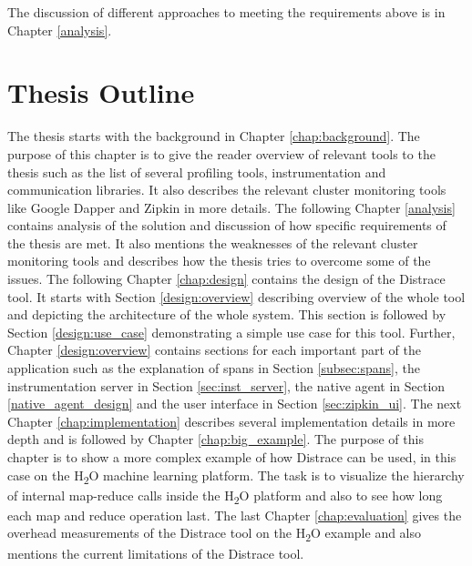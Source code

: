 The discussion of different approaches to meeting the requirements above is in Chapter \ref{analysis}.

\section{Thesis Outline}
The thesis starts with the background in Chapter \ref{chap:background}. The purpose of this chapter is to give the reader overview of relevant tools to the thesis such as the list of several profiling tools, instrumentation and communication libraries. It also describes the relevant cluster monitoring tools like Google Dapper and Zipkin in more details. The following Chapter \ref{analysis} contains analysis of the solution and discussion of how specific requirements of the thesis are met. It also mentions the weaknesses of the relevant cluster monitoring tools and describes how the thesis tries to overcome some of the issues. The following Chapter \ref{chap:design} contains the design of the Distrace tool. It starts with Section \ref{design:overview} describing overview of the whole tool and depicting the architecture of the whole system. This section is followed by Section \ref{design:use_case} demonstrating a simple use case for this tool. Further, Chapter \ref{design:overview} contains sections for each important part of the application such as the explanation of spans in Section \ref{subsec:spans}, the instrumentation server in Section \ref{sec:inst_server}, the native agent in Section \ref{native_agent_design} and the user interface in Section \ref{sec:zipkin_ui}. The next Chapter \ref{chap:implementation} describes several implementation details in more depth and is followed by Chapter \ref{chap:big_example}. The purpose of this chapter is to show a more complex example of how Distrace can be used, in this case on the H\textsubscript{2}O machine learning platform. The task is to visualize the hierarchy of internal map-reduce calls inside the H\textsubscript{2}O platform and also to see how long each map and reduce operation last. The last Chapter \ref{chap:evaluation} gives the overhead measurements of the Distrace tool on the H\textsubscript{2}O example and also mentions the current limitations of the Distrace tool. 
